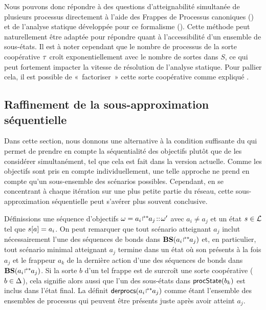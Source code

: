 Nous pouvons donc répondre à des questions d'atteignabilité simultanée de plusieurs processus
directement à l'aide des Frappes de Processus canoniques ()
et de l'analyse statique développée pour ce formalisme ().
Cette méthode peut naturellement être adaptée pour répondre quant à
l'accessibilité d'un ensemble de sous-états.
Il est à noter cependant que le nombre de processus de la sorte coopérative $\tau$
croît exponentiellement avec le nombre de sortes dans $S$, ce qui peut fortement impacter
la vitesse de résolution de l'analyse statique.
Pour pallier cela, il est possible de «~factoriser~» cette sorte coopérative comme expliqué
.




\subsection{Raffinement de la sous-approximation séquentielle}

Dans cette section, nous donnons une alternative à la condition suffisante du 
qui permet de prendre en compte la séquentialité des objectifs plutôt que de les considérer
simultanément, tel que cela est fait dans la version actuelle.
Comme les objectifs sont pris en compte individuellement, une telle approche ne prend en compte
qu'un sous-ensemble des scénarios possibles.
Cependant, en se concentrant à chaque itération sur une plus petite partie du réseau, 
cette sous-approximation séquentielle peut s'avérer plus souvent conclusive.

Définissions une séquence d'objectifs $\omega = {a_i\!\Rsh^*\!\!a_j} \!::\! \omega'$ avec
$a_i \neq a_j$ et un état $s \in \mathcal{L}$ tel que $s[{a}] = a_i$.
On peut remarquer que tout scénario atteignant $a_j$ inclut nécessairement l'une des séquences
de bonds dans $\mathbf{BS}({a_i\!\Rsh^*\!\!a_j})$ et, en particulier,
tout scénario minimal atteignant $a_j$ termine dans un état où son présents à la fois
$a_j$ et le frappeur $a_k$ de la dernière action d'une des séquences de bonds
dans $\mathbf{BS}({a_i\!\Rsh^*\!\!a_j})$.
Si la sorte $b$ d'un tel frappe est de surcroît une sorte coopérative ($b \in \Delta$),
cela signifie alors aussi que l'un des sous-états dans $\mathsf{procState}(b_k)$
est inclus dans l'état final.
La  définit $\mathsf{derprocs}({a_i\!\Rsh^*\!\!a_j})$ comme étant l'ensemble des ensembles
de processus qui peuvent être présents juste après avoir atteint $a_j$.


